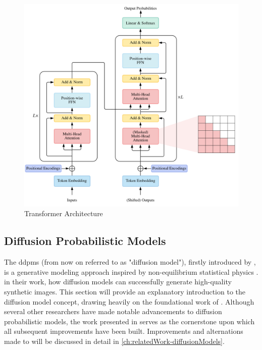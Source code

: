 \begin{figure}
  \includegraphics[width=0.8\linewidth]{images/transformer.png}
\caption[Transformers]{Transformer Architecture \cite[Figure 1, p. 3]{lin2022SurveyTransformers}} \label{fig:transformer}
\end{figure}


\subsection{Diffusion Probabilistic Models}
\label{ch:preliminaries-diffusionProbabilisticModels}

The \Glspl{ddpm} (from now on referred to as "diffusion model"), firstly introduced by \textcite{sohl-dickstein2015DeepUnsupervisedLearning}, is a generative modeling approach inspired by non-equilibrium statistical physics \cite{sohl-dickstein2015DeepUnsupervisedLearning}.
\textcite{ho2020DenoisingDiffusionProbabilistic} in their work, how diffusion models can successfully generate high-quality synthetic images.
This section will provide an explanatory introduction to the diffusion model concept, drawing heavily on the foundational work of \cite{ho2020DenoisingDiffusionProbabilistic}.
Although several other researchers have made notable advancements to diffusion probabilistic models, the work presented in \cite{sohl-dickstein2015DeepUnsupervisedLearning, ho2020DenoisingDiffusionProbabilistic} 
serves as the cornerstone upon which all subsequent improvements have been built.
Improvements and alternations made to \cite{ho2020DenoisingDiffusionProbabilistic} will be discussed in detail in \autoref{ch:relatedWork-diffusionModels}.

